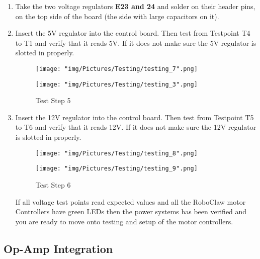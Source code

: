 \documentclass[12pt]{article}
\begin{document}
\begin{enumerate}
\item Take the two voltage regulators \textbf{E23 and 24} and solder on their header pins, on the top side of the board (the side with large capacitors on it). 

\item Insert the 5V regulator into the control board. Then test from Testpoint T4 to T1 and verify that it reads 5V. If it does not make sure the 5V regulator is slotted in properly.

\begin{figure}[H]
  \centering
  \begin{minipage}[b]{0.45\textwidth}
    \texttt{[image: "img/Pictures/Testing/testing\_7".png]}
  \end{minipage}
  \hfill
  \begin{minipage}[b]{0.45\textwidth}
    \texttt{[image: "img/Pictures/Testing/testing\_3".png]}
  \end{minipage}
  \caption{Test Step 5}
  \label{test_5}
\end{figure}

\item Insert the 12V regulator into the control board. Then test from Testpoint T5 to T6 and verify that it reads 12V. If it does not make sure the 12V regulator is slotted in properly.

\begin{figure}[H]
  \centering
  \begin{minipage}[b]{0.45\textwidth}
    \texttt{[image: "img/Pictures/Testing/testing\_8".png]}
  \end{minipage}
  \hfill
  \begin{minipage}[b]{0.45\textwidth}
    \texttt{[image: "img/Pictures/Testing/testing\_9".png]}
  \end{minipage}
  \caption{Test Step 6}
  \label{test_6}
\end{figure}

If all voltage test points read expected values and all the RoboClaw motor Controllers have green LEDs then the power systems has been verified and you are ready to move onto testing and setup of the motor controllers. 

\end{enumerate}

\subsection{Op-Amp Integration}
\end{document}
